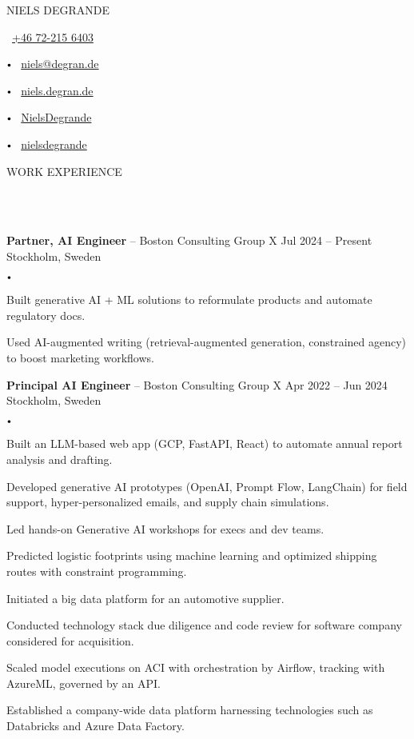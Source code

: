 \documentclass{article}
\newcommand{\contact}[2]{
    \begin{center}
    {\LARGE \uppercase {#1}} \\
    \vspace{8pt}
    #2
    \end{center}
    \vspace*{-8pt}
}
\newcommand{\header}[1]{
    {
        \hspace*{-4pt}
        \vspace*{8pt}
        \uppercase{#1}
    }
    \vspace*{-4pt} 
    \lineunder
    \vspace*{8pt}
}
\newcommand{\lineunder}{
    \vspace*{-8pt} \\ 
    \hspace*{-4pt} 
    \hrulefill \\
}
\newcommand{\experience}[5]{
    \vspace*{2pt}
    \textbf{#1} -- #2 \hfill #3 \\ 
    #4 \\
    #5
    \vspace*{2pt}
}
\newcommand{\bigdot}{
    $\vcenter{\hbox{\tiny$\bullet$}}$\hspace*{2pt}
}
\newcommand{\spacedbullet}{
    $\vcenter{\hbox{\tiny$\bullet$}}$\hspace*{-2pt}
}
\newenvironment{bulletlist}{
    \begin{list}
        {\spacedbullet}{\setlength\leftmargin{10pt} 
        \topsep 0pt \itemsep -2pt}}{\vspace*{4pt}
    \end{list}
}
\begin{document}
\small

\vspace*{-32pt}

\contact{Niels Degrande}
{
    \faPhone\ \href{tel:+46722156403}{+46 72-215 6403}
    \bigdot \faEnvelope\ \href{mailto:niels@degran.de}{niels@degran.de}
    \bigdot \faGlobe\ \href{https://niels.degran.de}{niels.degran.de}
    \bigdot \faGithub\ \href{https://github.com/NielsDegrande}{NielsDegrande}
    \bigdot \faLinkedin\ \href{https://linkedin.com/in/nielsdegrande}{nielsdegrande}
}

\vspace{16pt}

\header{Work Experience}
\experience{Partner, AI Engineer}{Boston Consulting Group X}{Jul 2024 -- Present}{Stockholm, Sweden}
{
    \begin{bulletlist}
        \item Built generative AI + ML solutions to reformulate products and automate regulatory docs.
        \item Used AI-augmented writing (retrieval-augmented generation, constrained agency) to boost marketing workflows.
    \end{bulletlist}
}

\experience{Principal AI Engineer}{Boston Consulting Group X}{Apr 2022 -- Jun 2024}{Stockholm, Sweden}
{
    \begin{bulletlist}
        \item Built an LLM-based web app (GCP, FastAPI, React) to automate annual report analysis and drafting.
        \item Developed generative AI prototypes (OpenAI, Prompt Flow, LangChain) for field support, hyper-personalized emails, and supply chain simulations.
        \item Led hands-on Generative AI workshops for execs and dev teams.
        \item Predicted logistic footprints using machine learning and optimized shipping routes with constraint programming.
        \item Initiated a big data platform for an automotive supplier.
        \item Conducted technology stack due diligence and code review for software company considered for acquisition.
        \item Scaled model executions on ACI with orchestration by Airflow, tracking with AzureML, governed by an API.
        \item Established a company-wide data platform harnessing technologies such as Databricks and Azure Data Factory.
    \end{bulletlist}
}
\end{document}
